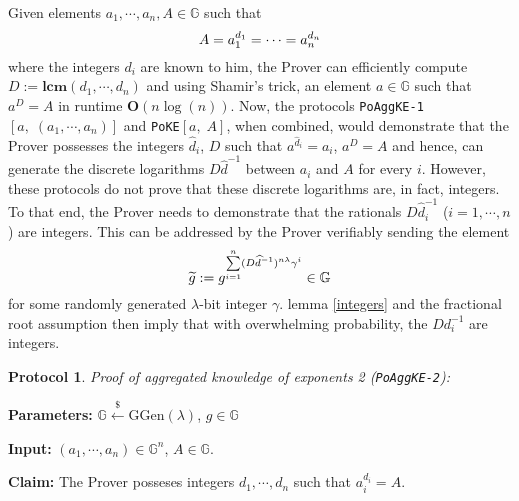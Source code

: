 \documentclass[11pt, lettersize, notitlepage, leqno, footskip=0.6cm]{article}
\newcommand{\slim}{\sum\limits}
\newcommand{\bG}{\mathbb{G}}
\newcommand{\wti}{\widetilde}
\newcommand{\mb}{\mathbb}
\newcommand{\mbf}{\mathbf}
\newcommand{\mr}{\mathrm}
\newcommand{\lam}{\lambda}
\newcommand{\lamb}{\lambda}
\newcommand{\what}{\widehat}
\newcommand{\vs}{\vspace{-0.15cm}}
\newcommand{\noin}{\noindent}
\newcommand{\LCM}{\mbf{lcm}}
\newtheorem{Prot}[Thm]{Protocol}
\numberwithin{equation}{section}
\begin{document}
{Given elements $a_1,\cdots,a_n, A\in\bG$} such that \vs $$A = a_1^{d_1} =\cdots = a_n^{d_n} \vs $$ where the integers $d_i$ are known to him, the Prover can efficiently compute $D:= \LCM(d_1,\cdots,d_n)$ and  using Shamir's trick, an element $a\in\mb{G}$ such that $a^D = A$ in runtime $\mbf{O}(n\log(n))$. Now, the protocols \verb|PoAggKE-1|$[a,\;(a_1,\cdots,a_n)]$ and \verb|PoKE|$[a,\;A]$, when combined, would demonstrate that the Prover possesses the integers $\what{d}_i$, $D$ such that $a^{\what{d}_i} = a_i$, $a^D = A$ and hence, can generate the discrete logarithms $D\what{d}^{-1}$ between $a_i$ and $A$ for every $i$. However, these protocols do not prove that these discrete logarithms are, in fact, integers. To that end, the Prover needs to demonstrate that the rationals $D\what{d}_i^{-1}$ ($i=1,\cdots, n$) are integers. This can be addressed by the Prover verifiably sending the element \vspace{-0.2cm} $$\wti{g} := g^{\slim_{i=1}^{n} (D\what{d}^{-1})^{n\lam}\gamma^i}\in\bG \vs $$ for some randomly generated $\lam$-bit integer $\gamma$. lemma \ref{integers} and the fractional root assumption then imply that with overwhelming probability, the $Dd_i^{-1}$ are integers.

 

\vspace{0.2cm}  

\begin{Prot}\normalfont \hypertarget{AggKE-2}{\textit{Proof of aggregated knowledge of exponents} 2 }(\verb|PoAggKE-2|): \end{Prot}\vspace{-0.3cm}

\noin \textbf{Parameters:} $\mb{G}\xleftarrow{\$} \mr{GGen}(\lamb)$,\; $g\in \mb{G}$ 

\noin \textbf{Input:} $(a_1,\cdots,a_n) \in \mb{G}^n$, $A\in\mb{G}$.

\noin \textbf{Claim:} The Prover posseses integers $d_1,\cdots,d_n$ such that $a_i^{d_i} = A$. \vs
\end{document}
